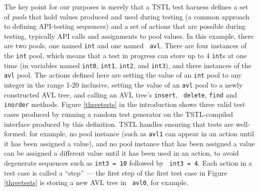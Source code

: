 The key point for our purposes is merely that a TSTL test harness
defines a set of \emph{pools} that hold values produced and used
during testing \cite{AndrewsTR} (a common approach to defining
API-testing sequences) and a set of actions that are possible during
testing, typically API calls and assignments to pool values.  In this
example, there are two pools, one named {\tt int} and one named {\tt
  avl}.  There are four instances of the {\tt int} pool, which means
that a test in progress can store up to 4 {\tt int}s at one time (in
variables named {\tt int0}, {\tt int1}, {\tt int2}, and {\tt int3}), and three
instances of the {\tt avl} pool.  The actions defined here are setting
the value of an {\tt int} pool to any integer in the range 1-20
inclusive, setting the value of an {\tt avl} pool to a newly
constructed AVL tree, and calling an AVL tree's {\tt insert}, {\tt
  delete}, {\tt find} and {\tt inorder} methods.  Figure
\ref{threetests} in the introduction shows three
valid test cases produced by running a random test generator on
the TSTL-compiled interface produced by this definition.  TSTL handles
ensuring that tests are well-formed: for example, no pool instance
(such as {\tt avl1} can appear in an action until it has been assigned
a value), and no pool instance that has been assigned a value can be
assigned a different value until it has been used in an action, to
avoid degenerate sequences such as {\tt int3 = 10} followed by {\tt
  int3 = 4}.  Each action in a test case is called a ``step'' --- the
first step of the first test case in Figure \ref{threetests} is storing a new AVL tree in {\tt
  avl0}, for example.

